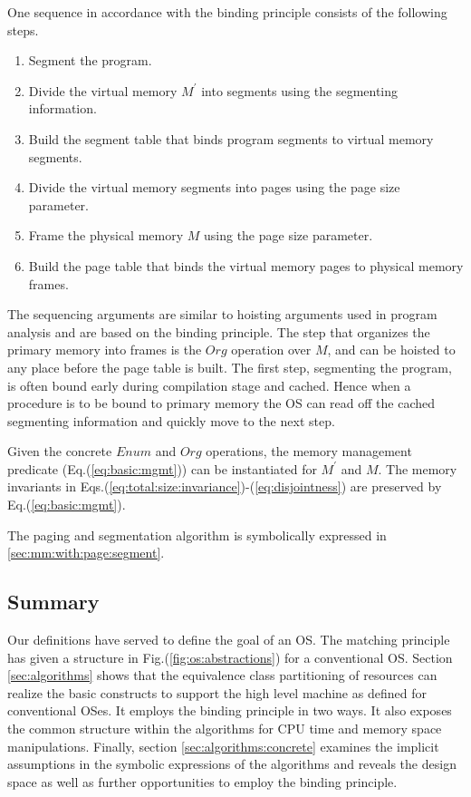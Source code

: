 \documentclass[draft]{article}
\begin{document}
One sequence in accordance with  the binding principle consists of the
following steps.
\label{paging:algo:schematic}
\begin{enumerate}
\item Segment the program.
\item Divide  the virtual  memory $M^\prime$  into segments  using the
  segmenting information.
\item Build the  segment table that binds program  segments to virtual
  memory segments.
\item Divide  the virtual  memory segments into  pages using  the page
  size parameter.
\item Frame  the physical memory $M$ using the page size parameter.
\item Build  the page  table that  binds the  virtual memory  pages to
  physical memory frames.
\end{enumerate}
The  sequencing arguments are  similar to  hoisting arguments  used in
program analysis  and are  based on the  binding principle.   The step
that organizes the  primary memory into frames is  the $Org$ operation
over $M$,  and can be  hoisted to any  place before the page  table is
built.  The first  step, segmenting the program, is  often bound early
during compilation stage and cached.   Hence when a procedure is to be
bound  to primary memory  the OS  can read  off the  cached segmenting
information and quickly move to the next step.

Given the concrete $Enum$  and $Org$ operations, the memory management
predicate   (Eq.(\ref{eq:basic:mgmt}))   can   be   instantiated   for
$M^\prime$     and     $M$.       The     memory     invariants     in
Eqs.(\ref{eq:total:size:invariance})-(\ref{eq:disjointness})       are
preserved by Eq.(\ref{eq:basic:mgmt}).

The  paging and  segmentation algorithm  is symbolically  expressed in
\ref{sec:mm:with:page:segment}.

\subsection{Summary}
\label{sec:single:cpu:summary}

Our definitions have served to define the goal of an OS.  The matching
principle has given a structure in Fig.(\ref{fig:os:abstractions}) for
a  conventional  OS.   Section  \ref{sec:algorithms}  shows  that  the
equivalence  class partitioning  of  resources can  realize the  basic
constructs  to   support  the  high  level  machine   as  defined  for
conventional OSes.  It employs the  binding principle in two ways.  It
also exposes the  common structure within the algorithms  for CPU time
and     memory      space     manipulations.      Finally,     section
\ref{sec:algorithms:concrete} examines the implicit assumptions in the
symbolic expressions of the algorithms and reveals the design space as
well as further opportunities to employ the binding principle.
\end{document}
